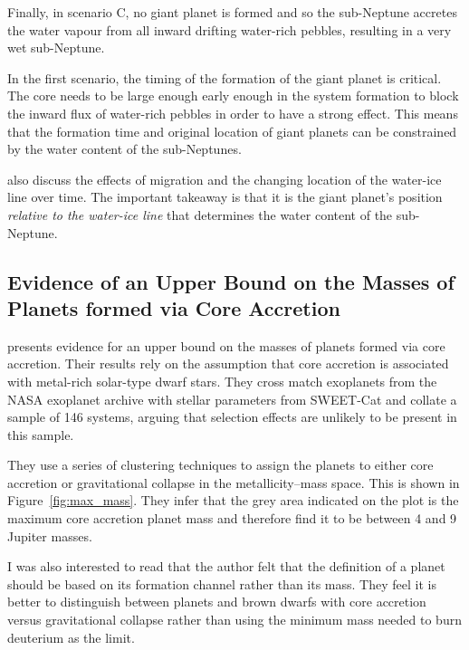 \documentclass[twocolumn]{aastex631}
\begin{document}
Finally, in scenario C, no giant planet is formed and so the sub-Neptune accretes the water vapour from all inward drifting water-rich pebbles, resulting in a very wet sub-Neptune.

In the first scenario, the timing of the formation of the giant planet is critical. The core needs to be large enough early enough in the system formation to block the inward flux of water-rich pebbles in order to have a strong effect. This means that the formation time and original location of giant planets can be constrained by the water content of the sub-Neptunes.

\citet{Bitsch+2021} also discuss the effects of migration and the changing location of the water-ice line over time. The important takeaway is that it is the giant planet's position \textit{relative to the water-ice line} that determines the water content of the sub-Neptune.

\subsection{Evidence of an Upper Bound on the Masses of Planets formed via Core Accretion}

\citet{Schlaufman+2018} presents evidence for an upper bound on the masses of planets formed via core accretion. Their results rely on the assumption that core accretion is associated with metal-rich solar-type dwarf stars. They cross match exoplanets from the NASA exoplanet archive with stellar parameters from SWEET-Cat and collate a sample of 146 systems, arguing that selection effects are unlikely to be present in this sample.

They use a series of clustering techniques to assign the planets to either core accretion or gravitational collapse in the metallicity--mass space. This is shown in Figure~\ref{fig:max_mass}. They infer that the grey area indicated on the plot is the maximum core accretion planet mass and therefore find it to be between 4 and 9 Jupiter masses.

I was also interested to read that the author felt that the definition of a planet should be based on its formation channel rather than its mass. They feel it is better to distinguish between planets and brown dwarfs with core accretion versus gravitational collapse rather than using the minimum mass needed to burn deuterium as the limit.
\end{document}
